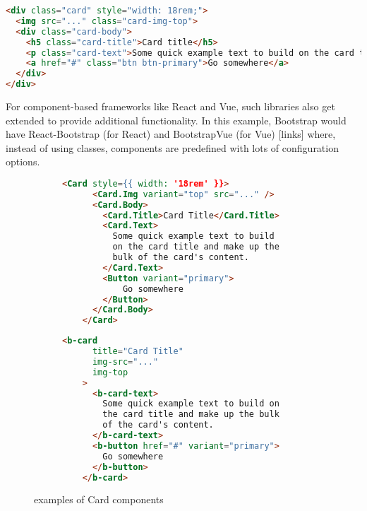 \documentclass{l4proj}
\begin{document}
\begin{lstlisting}[language=html, caption={example of a Card element as \href{https://getbootstrap.com/docs/5.1/components/card/\#example}{documented on Bootstrap v5}}]
<div class="card" style="width: 18rem;">
  <img src="..." class="card-img-top">
  <div class="card-body">
    <h5 class="card-title">Card title</h5>
    <p class="card-text">Some quick example text to build on the card title and make up the bulk of the card's content.</p>
    <a href="#" class="btn btn-primary">Go somewhere</a>
  </div>
</div>
\end{lstlisting}

For component-based frameworks like React and Vue, such libraries also get extended to provide additional functionality. In this example, Bootstrap would have React-Bootstrap (for React) and BootstrapVue (for Vue) [links] where, instead of using classes, components are predefined with lots of configuration options.

\begin{figure}
    \centering
    \noindent\begin{subfigure}{.49\textwidth}
    \begin{lstlisting}[language=html, caption={\href{https://react-bootstrap.github.io/components/cards/\#basic-example}{documented on React-Bootstrap}}]
    <Card style={{ width: '18rem' }}>
      <Card.Img variant="top" src="..." />
      <Card.Body>
        <Card.Title>Card Title</Card.Title>
        <Card.Text>
          Some quick example text to build
          on the card title and make up the
          bulk of the card's content.
        </Card.Text>
        <Button variant="primary">
            Go somewhere
        </Button>
      </Card.Body>
    </Card>
    \end{lstlisting}
    \end{subfigure}\hfill
    \begin{subfigure}{.49\textwidth}
    \begin{lstlisting}[language=html, caption={\href{https://bootstrap-vue.org/docs/components/card\#overview}{documented on BootstrapVue}}]
    <b-card
      title="Card Title"
      img-src="..."
      img-top
    >
      <b-card-text>
        Some quick example text to build on
        the card title and make up the bulk
        of the card's content.
      </b-card-text>
      <b-button href="#" variant="primary">
        Go somewhere
      </b-button>
    </b-card>
    \end{lstlisting}
    \end{subfigure}
    \caption{examples of Card components}
\end{figure}
\end{document}
